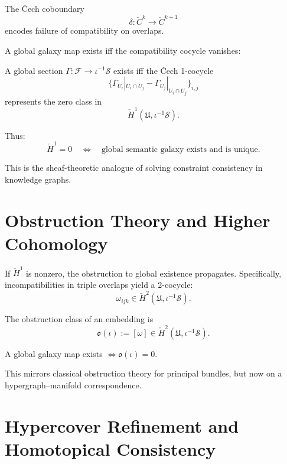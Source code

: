 The Čech coboundary
\[
  \delta : \check{C}^k \to \check{C}^{k+1}
\]
encodes failure of compatibility on overlaps.

A global galaxy map exists iff the compatibility cocycle vanishes:

\begin{theorem}
A global section
\(
  \Gamma : \mathcal{F} \to \iota^{-1}\mathscr{S}
\)
exists iff the Čech 1-cocycle
\[
  \{\Gamma_{U_i}|_{U_i\cap U_j}
    - \Gamma_{U_j}|_{U_i\cap U_j}\}_{i,j}
\]
represents the zero class in
\[
  \check{H}^1(\mathfrak{U},\iota^{-1}\mathscr{S}).
\]
\end{theorem}

Thus:
\[
  \check{H}^1 = 0
  \quad\Longleftrightarrow\quad
  \text{global semantic galaxy exists and is unique}.
\]

This is the sheaf-theoretic analogue of solving constraint consistency in
knowledge graphs.

\section{Obstruction Theory and Higher Cohomology}

If $\check{H}^1$ is nonzero, the obstruction to global existence propagates.
Specifically, incompatibilities in triple overlaps yield a 2-cocycle:
\[
  \omega_{ijk}
  \in 
  \check{H}^2(\mathfrak{U},\iota^{-1}\mathscr{S}).
\]

\begin{definition}
The obstruction class of an embedding is
\[
  \mathfrak{o}(\iota)
  :=
  [\omega]
  \in \check{H}^2(\mathfrak{U},\iota^{-1}\mathscr{S}).
\]
\end{definition}

\begin{theorem}
A global galaxy map exists 
\(
\iff
\mathfrak{o}(\iota)=0.
\)
\end{theorem}

This mirrors classical obstruction theory for principal bundles,
but now on a hypergraph–manifold correspondence.

\section{Hypercover Refinement and Homotopical Consistency}


